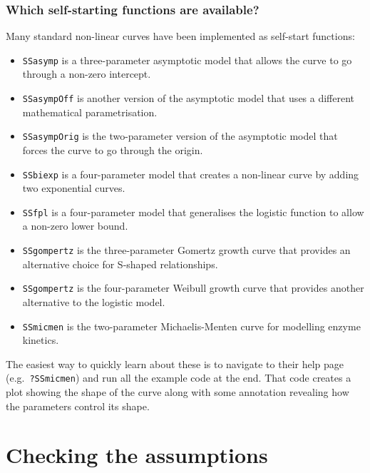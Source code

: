 \documentclass[
]{book}
\providecommand{\tightlist}{%
  \setlength{\itemsep}{0pt}\setlength{\parskip}{0pt}}
\newenvironment{greybox}{
  \definecolor{shadecolor}{rgb}{0.95,0.95,0.95}  %
  \color{black}
  \begin{shaded}}
 {\end{shaded}}
\newenvironment{infobox}[1]
  {
  \begin{itemize}
  \renewcommand{\labelitemi}{
    \raisebox{-.7\height}[0pt][0pt]{
      {\setkeys{Gin}{width=3em,keepaspectratio}
        \texttt{[image: images/\#1]}}
    }
  }
  \setlength{\fboxsep}{1em}
  \begin{greybox}
  \item
  }
  {
  \end{greybox}
  \end{itemize}
  }
\begin{document}
\begin{infobox}{information}

\hypertarget{which-self-starting-functions-are-available}{%
\subsubsection*{Which self-starting functions are available?}\label{which-self-starting-functions-are-available}}

Many standard non-linear curves have been implemented as self-start functions:

\begin{itemize}
\tightlist
\item
  \texttt{SSasymp} is a three-parameter asymptotic model that allows the curve to go through a non-zero intercept.
\item
  \texttt{SSasympOff} is another version of the asymptotic model that uses a different mathematical parametrisation.
\item
  \texttt{SSasympOrig} is the two-parameter version of the asymptotic model that forces the curve to go through the origin.
\item
  \texttt{SSbiexp} is a four-parameter model that creates a non-linear curve by adding two exponential curves.
\item
  \texttt{SSfpl} is a four-parameter model that generalises the logistic function to allow a non-zero lower bound.
\item
  \texttt{SSgompertz} is the three-parameter Gomertz growth curve that provides an alternative choice for S-shaped relationships.
\item
  \texttt{SSgompertz} is the four-parameter Weibull growth curve that provides another alternative to the logistic model.
\item
  \texttt{SSmicmen} is the two-parameter Michaelis-Menten curve for modelling enzyme kinetics.
\end{itemize}

The easiest way to quickly learn about these is to navigate to their help page (e.g.~\texttt{?SSmicmen}) and run all the example code at the end. That code creates a plot showing the shape of the curve along with some annotation revealing how the parameters control its shape.

\end{infobox}

\hypertarget{checking-the-assumptions}{%
\section{Checking the assumptions}\label{checking-the-assumptions}}
\end{document}
